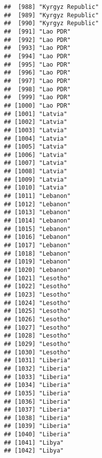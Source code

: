 \documentclass[]{article}
\begin{document}
\begin{verbatim}
##  [988] "Kyrgyz Republic"                    
##  [989] "Kyrgyz Republic"                    
##  [990] "Kyrgyz Republic"                    
##  [991] "Lao PDR"                            
##  [992] "Lao PDR"                            
##  [993] "Lao PDR"                            
##  [994] "Lao PDR"                            
##  [995] "Lao PDR"                            
##  [996] "Lao PDR"                            
##  [997] "Lao PDR"                            
##  [998] "Lao PDR"                            
##  [999] "Lao PDR"                            
## [1000] "Lao PDR"                            
## [1001] "Latvia"                             
## [1002] "Latvia"                             
## [1003] "Latvia"                             
## [1004] "Latvia"                             
## [1005] "Latvia"                             
## [1006] "Latvia"                             
## [1007] "Latvia"                             
## [1008] "Latvia"                             
## [1009] "Latvia"                             
## [1010] "Latvia"                             
## [1011] "Lebanon"                            
## [1012] "Lebanon"                            
## [1013] "Lebanon"                            
## [1014] "Lebanon"                            
## [1015] "Lebanon"                            
## [1016] "Lebanon"                            
## [1017] "Lebanon"                            
## [1018] "Lebanon"                            
## [1019] "Lebanon"                            
## [1020] "Lebanon"                            
## [1021] "Lesotho"                            
## [1022] "Lesotho"                            
## [1023] "Lesotho"                            
## [1024] "Lesotho"                            
## [1025] "Lesotho"                            
## [1026] "Lesotho"                            
## [1027] "Lesotho"                            
## [1028] "Lesotho"                            
## [1029] "Lesotho"                            
## [1030] "Lesotho"                            
## [1031] "Liberia"                            
## [1032] "Liberia"                            
## [1033] "Liberia"                            
## [1034] "Liberia"                            
## [1035] "Liberia"                            
## [1036] "Liberia"                            
## [1037] "Liberia"                            
## [1038] "Liberia"                            
## [1039] "Liberia"                            
## [1040] "Liberia"                            
## [1041] "Libya"                              
## [1042] "Libya"                              

\end{verbatim}
\end{document}
